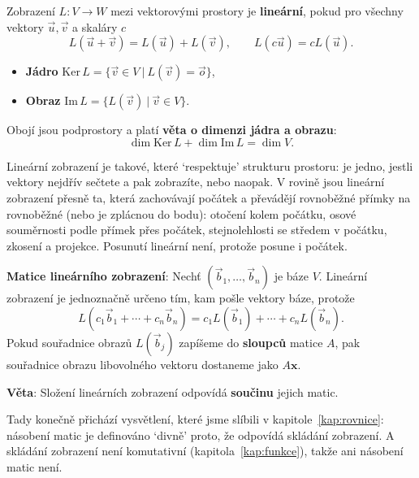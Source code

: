 \begin{definitionbox}
  Zobrazení $L: V\to W$ mezi vektorovými prostory je \textbf{lineární}, pokud pro všechny vektory $\vec{u}, \vec{v}$ a skaláry $c$
  \begin{equation*}
    L(\vec{u} + \vec{v}) = L(\vec{u}) + L(\vec{v}),\qquad L(c\vec{u}) = cL(\vec{u}).
  \end{equation*}
  \begin{itemize}
    \item \textbf{Jádro} $\mathrm{Ker}\,L = \{\vec{v}\in V\ |\ L(\vec{v}) = \vec{o}\}$,
    \item \textbf{Obraz} $\mathrm{Im}\,L = \{L(\vec{v})\ |\ \vec{v}\in V\}$.
  \end{itemize}
  Obojí jsou podprostory a platí \textbf{věta o dimenzi jádra a obrazu}:
  \begin{equation*}
    \dim\mathrm{Ker}\,L + \dim\mathrm{Im}\,L = \dim V.
  \end{equation*}
\end{definitionbox}

Lineární zobrazení je takové, které `respektuje' strukturu prostoru: je jedno, jestli vektory nejdřív sečtete a pak zobrazíte, nebo naopak. V rovině jsou lineární zobrazení přesně ta, která zachovávají počátek a převádějí rovnoběžné přímky na rovnoběžné (nebo je zplácnou do bodu): otočení kolem počátku, osové souměrnosti podle přímek přes počátek, stejnolehlosti se středem v počátku, zkosení a projekce. Posunutí lineární není, protože posune i počátek.

\begin{definitionbox}
  \textbf{Matice lineárního zobrazení}: Nechť $(\vec{b}_1, \ldots, \vec{b}_n)$ je báze $V$. Lineární zobrazení je jednoznačně určeno tím, kam pošle vektory báze, protože
  \begin{equation*}
    L(c_1\vec{b}_1 + \cdots + c_n\vec{b}_n) = c_1L(\vec{b}_1) + \cdots + c_nL(\vec{b}_n).
  \end{equation*}
  Pokud souřadnice obrazů $L(\vec{b}_j)$ zapíšeme do \textbf{sloupců} matice $A$, pak souřadnice obrazu libovolného vektoru dostaneme jako $A\mathbf{x}$.

  \vspace{0.2cm}

  \textbf{Věta}: Složení lineárních zobrazení odpovídá \textbf{součinu} jejich matic.
\end{definitionbox}

Tady konečně přichází vysvětlení, které jsme slíbili v kapitole~\ref{kap:rovnice}: násobení matic je definováno `divně' proto, že odpovídá skládání zobrazení. A skládání zobrazení není komutativní (kapitola~\ref{kap:funkce}), takže ani násobení matic není.

